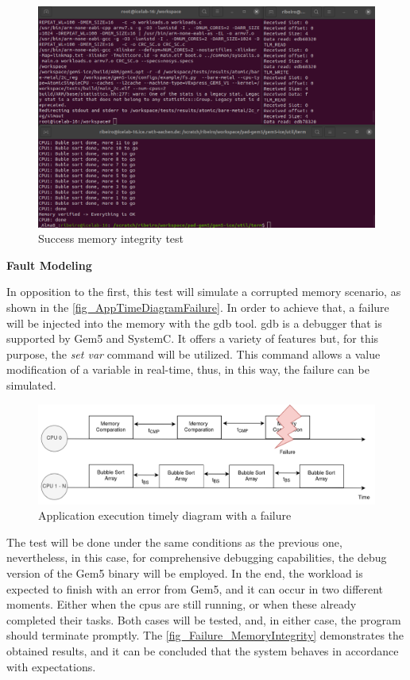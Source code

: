 \begin{figure}[H]
	\centering
 	\includegraphics[width=0.8\linewidth]{Images/Success_MemoryIntegrity.png} 
 	\caption{Success memory integrity test}
\end{figure}


\textbf{Fault Modeling}
\newline

In opposition to the first, this test will simulate a corrupted memory scenario, as shown in the \autoref{fig_AppTimeDiagramFailure}. 
In order to achieve that, a failure will be injected into the memory with the \gls{gdb} tool. \gls{gdb} is a debugger 
that is supported by Gem5 and SystemC. It offers a variety of features but, for this purpose, the \textit{set var} \space command will be utilized. 
This command allows a value modification of a variable in real-time, thus, in this way, the failure can be simulated.

\begin{figure}[H]
	\centering
 	\includegraphics[width=0.8\linewidth]{Images/AppTimeDiagramFailure.png}
 	\caption{Application execution timely diagram with a failure}
	 \label{fig_AppTimeDiagramFailure}
\end{figure}


The test will be done under the same conditions as the previous one, nevertheless, in this case, for comprehensive debugging capabilities, 
the debug version of the Gem5 binary will be employed. In the end, the workload is expected to finish with an error from Gem5, and it can occur 
in two different moments. Either when the \glspl{cpu} are still running, or when these already completed their tasks. Both cases  
will be tested, and, in either case, the program should terminate promptly. The \autoref{fig_Failure_MemoryIntegrity} demonstrates the obtained 
results, and it can be concluded that the system behaves in accordance with expectations.

